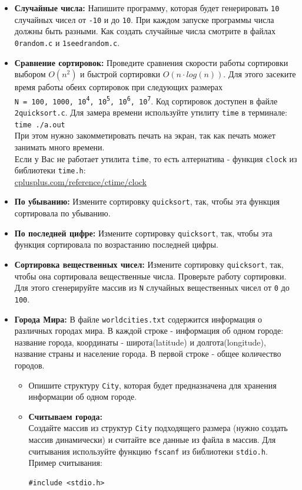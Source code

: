 \documentclass{article}
\begin{document}
\begin{itemize}
\item \textbf{Случайные числа:} Напишите программу, которая будет генерировать \texttt{10} случайных чисел от \texttt{-10} и до \texttt{10}. При каждом запуске программы числа должны быть разными. Как создать случайные числа смотрите в файлах \texttt{0random.c} и \texttt{1seedrandom.c}.
\item \textbf{Сравнение сортировок:} Проведите сравнения скорости работы сортировки выбором $O(n^2)$ и быстрой сортировки $O(n \cdot log(n))$. Для этого засеките время работы обеих сортировок при следующих размерах \\
\texttt{N = 100, 1000, 10\textsuperscript{4}, 10\textsuperscript{5}, 10\textsuperscript{6}, 10\textsuperscript{7}}. Код сортировок доступен в файле \texttt{2quicksort.c}.
Для замера времени используйте утилиту \texttt{time} в терминале:\\
\texttt{time ./a.out}\\
При этом нужно закомметировать печать на экран, так как печать может занимать много времени.\\
Если у Вас не работает утилита \texttt{time}, то есть алтернатива - функция \texttt{clock} из библиотеки \texttt{time.h}:   \\
\href{http://www.cplusplus.com/reference/ctime/clock/}{cplusplus.com/reference/ctime/clock}
\item \textbf{По убыванию:} Измените сортировку \texttt{quicksort}, так, чтобы эта функция сортировала по убыванию.
\item \textbf{По последней цифре:} Измените сортировку \texttt{quicksort}, так, чтобы эта функция сортировала по возрастанию последней цифры.
\item \textbf{Сортировка вещественных чисел:} Измените сортировку \texttt{quicksort}, так, чтобы она сортировала вещественные числа. Проверьте работу сортировки. Для этого сгенерируйте массив из \texttt{N} случайных вещественных чисел от \texttt{0} до \texttt{100}.
\item \textbf{Города Мира:} В файле \texttt{worldcities.txt} содержится информация о различных городах мира. В каждой строке - информация об одном городе: название города, координаты -  широта(latitude) и долгота(longitude), название страны и население города. В первой строке - общее количество городов.
\begin{itemize}
\item Опишите структуру \texttt{City}, которая будет предназначена для хранения информации об одном городе.
\item \textbf{Считываем города:}\\ Создайте массив из структур \texttt{City} подходящего размера (нужно создать массив динамически) и считайте все данные из файла в массив. Для считывания используйте функцию \texttt{fscanf} из библиотеки \texttt{stdio.h}. Пример считывания:
\begin{lstlisting}
#include <stdio.h>


\end{lstlisting}
\end{itemize}
\end{itemize}
\end{document}
